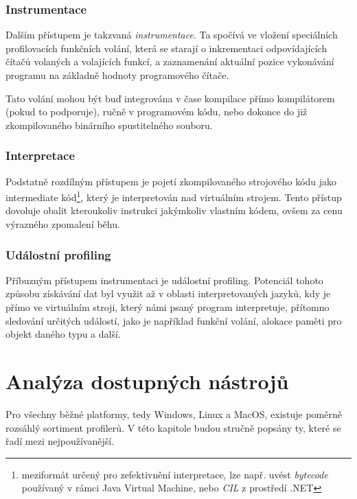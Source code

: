 \documentclass[czech,BP]{thesiskiv}
\begin{document}
\subsection{Instrumentace}

Dalším přístupem je takzvaná \emph{instrumentace}. Ta spočívá ve vložení speciálních profilovacích funkčních volání, která se starají o inkrementaci odpovídajících čítačů volaných a volajících funkcí, a zaznamenání aktuální pozice vykonávání programu na základně hodnoty programového čítače.

Tato volání mohou být buď integrována v čase kompilace přímo kompilátorem (pokud to podporuje), ručně v programovém kódu, nebo dokonce do již zkompilovaného binárního spustitelného souboru.

\subsection{Interpretace}

Podstatně rozdílným přístupem je pojetí zkompilovaného strojového kódu jako intermediate kód\footnote{meziformát určený pro zefektivnění interpretace, lze např. uvést \emph{bytecode} používaný v rámci Java Virtual Machine, nebo \emph{CIL} z prostředí .NET}, který je interpretován nad virtuálním strojem\cite{grind2}. Tento přístup dovoluje obalit kteroukoliv instrukci jakýmkoliv vlastním kódem, ovšem za cenu výrazného zpomalení běhu.

\subsection{Událostní profiling}

Příbuzným přístupem instrumentaci je událostní profiling. Potenciál tohoto způsobu získávání dat byl využit až v oblasti interpretovaných jazyků, kdy je přímo ve virtuálním stroji, který námi psaný program interpretuje, přítomno sledování určitých událostí, jako je například funkční volání, alokace paměti pro objekt daného typu a další.


\newpage

\chapter{Analýza dostupných nástrojů}

Pro všechny běžné platformy, tedy Windows, Linux a MacOS, existuje poměrně rozsáhlý sortiment profilerů. V této kapitole budou stručně popsány ty, které se řadí mezi nejpoužívanější.
\end{document}
